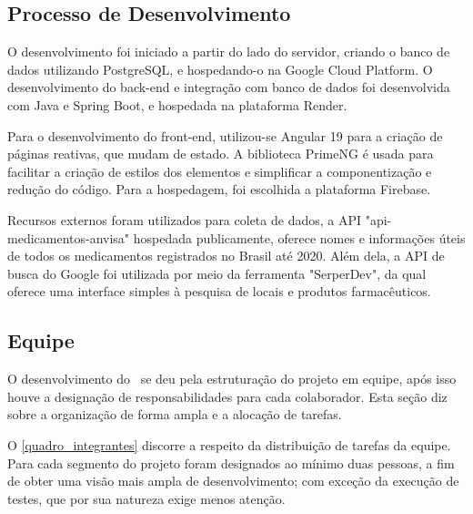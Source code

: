 \documentclass[
	article,			%
	12pt,				%
	oneside,			%
	a4paper,			%
    BIBLATEX,           %
	english,			%
	brazil,				%
	sumario=tradicional
	]{abntex2}
\begin{document}
\subsection{Processo de Desenvolvimento}

O desenvolvimento foi iniciado a partir do lado do servidor, criando o banco de dados utilizando PostgreSQL, e hospedando-o na Google Cloud Platform. O desenvolvimento do back-end e integração com banco de dados foi desenvolvida com Java e Spring Boot, e hospedada na plataforma Render.

Para o desenvolvimento do front-end, utilizou-se Angular 19 para a criação de páginas reativas, que mudam de estado. A biblioteca PrimeNG é usada para facilitar a criação de estilos dos elementos e simplificar a componentização e redução do código. Para a hospedagem, foi escolhida a plataforma Firebase.

Recursos externos foram utilizados para coleta de dados, a API "api-medicamentos-anvisa" hospedada publicamente, oferece nomes e informações úteis de todos os medicamentos registrados no Brasil até 2020. Além dela, a API de busca do Google foi utilizada por meio da ferramenta "SerperDev", da qual oferece uma interface simples à pesquisa de locais e produtos farmacêuticos.

\subsection{Equipe}

O desenvolvimento do \nomeprojeto\ se deu pela estruturação do projeto em equipe, após isso houve a designação de responsabilidades para cada colaborador. Esta seção diz sobre a organização de forma ampla e a alocação de tarefas.

O \autoref{quadro_integrantes} discorre a respeito da distribuição de tarefas da equipe. Para cada segmento do projeto foram designados ao mínimo duas pessoas, a fim de obter uma visão mais ampla de desenvolvimento; com exceção da execução de testes, que por sua natureza exige menos atenção. 

\pagebreak
\end{document}
